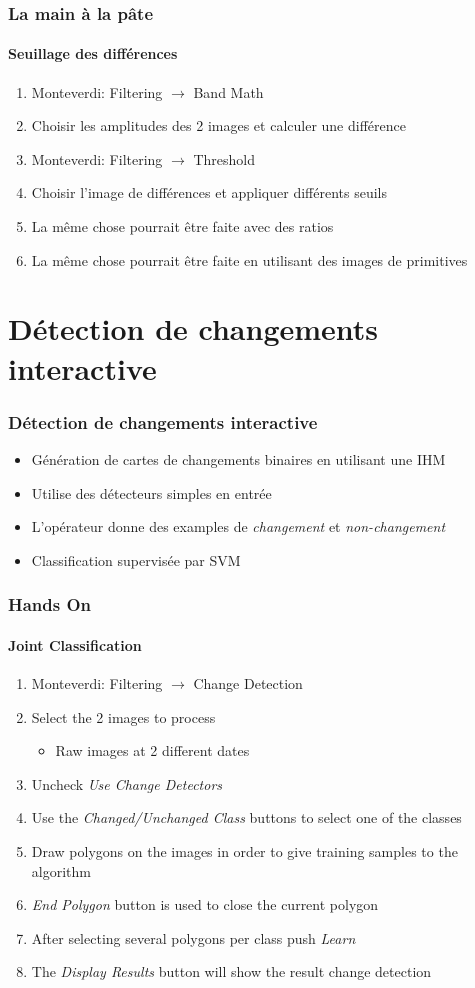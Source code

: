 \documentclass[compress]{beamer}
\begin{document}
\begin{frame}
  \frametitle{La main à la pâte}
  \framesubtitle{Seuillage des différences}
  \begin{enumerate}
  \item Monteverdi: Filtering $\rightarrow$ Band Math
  \item Choisir les amplitudes des 2 images et calculer une différence
  \item Monteverdi: Filtering $\rightarrow$ Threshold
  \item Choisir l'image de différences et appliquer différents seuils
  \item La même chose pourrait être faite avec des ratios
  \item La même chose pourrait être faite en utilisant des images de primitives
  \end{enumerate}
\end{frame}


\section[Application]{Détection de changements interactive}

\begin{frame}
  \frametitle{Détection de changements interactive}
  \begin{itemize}
    \item Génération de cartes de changements binaires en utilisant une
      IHM
    \item Utilise des détecteurs simples en entrée
    \item L'opérateur donne des examples de {\em changement} et {\em non-changement}
    \item Classification supervisée par SVM
  \end{itemize}
\end{frame}


\begin{frame}
  \frametitle{Hands On}
  \framesubtitle{Joint Classification}
  \begin{enumerate}
  \item Monteverdi: Filtering $\rightarrow$ Change Detection
  \item Select the 2 images to process
    \begin{itemize}
    \item Raw images at 2 different dates
    \end{itemize}
  \item Uncheck {\em Use Change Detectors}
  \item Use the {\em Changed/Unchanged Class} buttons to select one of
    the classes
  \item Draw polygons on the images in order to give training samples
    to the algorithm
  \item {\em End Polygon} button is used to close the current polygon
  \item After selecting several polygons per class push {\em Learn}
  \item The {\em Display Results} button will show the result change detection
  \end{enumerate}
\end{frame}
\end{document}
